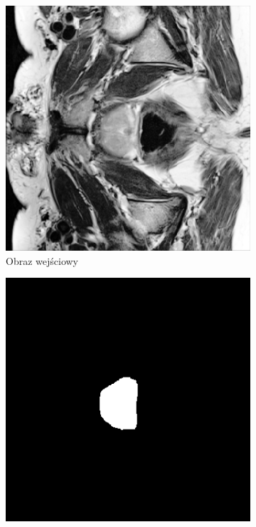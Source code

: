 \documentclass[a4paper,11pt,twoside]{report}
\theoremstyle{definition}
\begin{document}
\begin{figure}[htb]
	\centering %
	\begin{subfigure}{0.25\textwidth}
		\includegraphics[width=\linewidth]{segmentation/segmentation_train_1.png}
		\caption{Obraz wejściowy}
		\label{fig:1}
	\end{subfigure}\hfil %
	\begin{subfigure}{0.25\textwidth}
		\includegraphics[width=\linewidth]{segmentation/segmentaion_mask_1.png}

\end{subfigure}
\end{figure}
\end{document}
